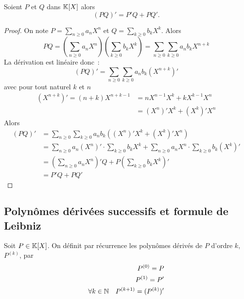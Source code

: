 \begin{prop}
  Soient \(P\) et \(Q\) dans \(\mathbb{K}[X]\) alors
  \begin{equation}
    (PQ)' = P'Q +PQ'.
  \end{equation}
\end{prop}
\begin{proof}
  On note \(P = \sum_{n \geqslant 0} a_n X^n\) et \(Q = \sum_{k \geqslant 0} b_k
  X^k\). Alors
  \begin{equation}
    PQ = \left(\sum_{n \geqslant 0} a_n X^n\right) \left(\sum_{k \geqslant 0}
    b_k X^k\right) = \sum_{n \geqslant 0} \sum_{k \geqslant 0} a_nb_k X^{n+k}
  \end{equation}
  La dérivation est linéaire donc~:
  \begin{equation}
    (PQ)' = \sum_{n \geqslant 0} \sum_{k \geqslant 0} a_nb_k (X^{n+k})'
  \end{equation}
  avec pour tout naturel \(k\) et \(n\)
  \begin{align}
    (X^{n+k})' =(n+k)X^{n+k-1} & = nX^{n-1}X^k +kX^{k-1}X^n\\
    & = (X^n)'X^k +(X^k)'X^n
  \end{align}
  Alors
  \begin{align}
    (PQ)' &= \sum_{n \geqslant 0} \sum_{k \geqslant 0} a_nb_k ((X^n)'X^k
    +(X^k)'X^n) \\
    &= \sum_{n \geqslant 0} a_n (X^n)' \cdot \sum_{k \geqslant 0} b_k X^k +
    \sum_{n \geqslant 0} a_n X^n \cdot \sum_{k \geqslant 0} b_k (X^k)' \\
    &= \left(\sum_{n \geqslant 0} a_n X^n\right)' Q + P \left(\sum_{k \geqslant
    0} b_k X^k\right)' \\
    & = P'Q+PQ'
  \end{align}
\end{proof}

\subsection{Polynômes dérivées successifs et formule de Leibniz}

\begin{defdef}
  Soit \(P \in \mathbb{K}[X]\). On définit par récurrence les polynômes dérivés de \(P\)
  d'ordre \(k\), \(P^{(k)}\), par
  \begin{align}
    P^{(0)} = P\\
    P^{(1)} = P'\\
    \forall k \in \mathbb{N} \quad P^{(k+1)} = (P^{(k)})'
  \end{align}
\end{defdef}

